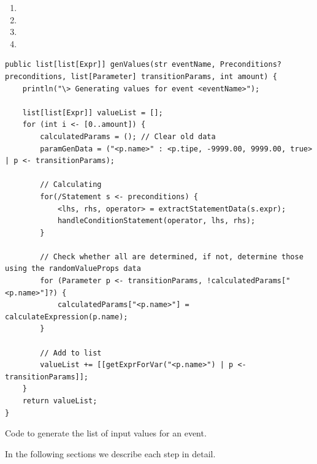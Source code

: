 \begin{enumerate}
  \item {}
  \item {}
  \item {}
  \item {}
\end{enumerate}
\begin{sourcecode}[!ht]
\begin{lstlisting}[language=Rascal]
public list[list[Expr]] genValues(str eventName, Preconditions? preconditions, list[Parameter] transitionParams, int amount) {
    println("\> Generating values for event <eventName>");

    list[list[Expr]] valueList = [];
    for (int i <- [0..amount]) {
        calculatedParams = (); // Clear old data
        paramGenData = ("<p.name>" : <p.tipe, -9999.00, 9999.00, true> | p <- transitionParams);

        // Calculating
        for(/Statement s <- preconditions) {
            <lhs, rhs, operator> = extractStatementData(s.expr);
            handleConditionStatement(operator, lhs, rhs);
        }

        // Check whether all are determined, if not, determine those using the randomValueProps data
        for (Parameter p <- transitionParams, !calculatedParams["<p.name>"]?) {
            calculatedParams["<p.name>"] = calculateExpression(p.name);
        }

        // Add to list
        valueList += [[getExprForVar("<p.name>") | p <- transitionParams]];
    }
    return valueList;
}
\end{lstlisting}
\caption{Code to generate the list of input values for an event.}
\label{lst:experiment3_value_generation_code}
\end{sourcecode}
\FloatBarrier\noindent
%
In the following sections we describe each step in detail.

